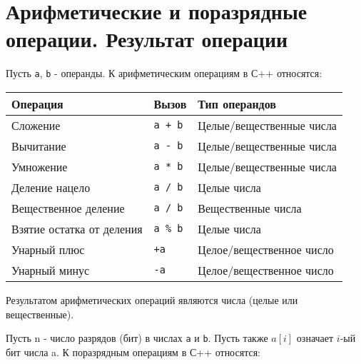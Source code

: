 \section{Арифметические и поразрядные операции. Результат
операции}\label{ux430ux440ux438ux444ux43cux435ux442ux438ux447ux435ux441ux43aux438ux435-ux438-ux43fux43eux440ux430ux437ux440ux44fux434ux43dux44bux435-ux43eux43fux435ux440ux430ux446ux438ux438.-ux440ux435ux437ux443ux43bux44cux442ux430ux442-ux43eux43fux435ux440ux430ux446ux438ux438}

Пусть \texttt{a}, \texttt{b} - операнды. К арифметическим операциям в
С++ относятся:

\begin{longtable}[]{@{}lll@{}}
\toprule\noalign{}
Операция & Вызов & Тип операндов \\
\midrule\noalign{}
\endhead
\bottomrule\noalign{}
\endlastfoot
Сложение & \texttt{a\ +\ b} & Целые/вещественные числа \\
Вычитание & \texttt{a\ -\ b} & Целые/вещественные числа \\
Умножение & \texttt{a\ *\ b} & Целые/вещественные числа \\
Деление нацело & \texttt{a\ /\ b} & Целые числа \\
Вещественное деление & \texttt{a\ /\ b} & Вещественные числа \\
Взятие остатка от деления & \texttt{a\ \%\ b} & Целые числа \\
Унарный плюс & \texttt{+a} & Целое/вещественное число \\
Унарный минус & \texttt{-a} & Целое/вещественное число \\
\end{longtable}

Результатом арифметических операций являются числа (целые или
вещественные).

Пусть n - число разрядов (бит) в числах \texttt{a} и \texttt{b}. Пусть
также \(a[i]\) означает \(i\)-ый бит числа a. К поразрядным операциям в
С++ относятся:

